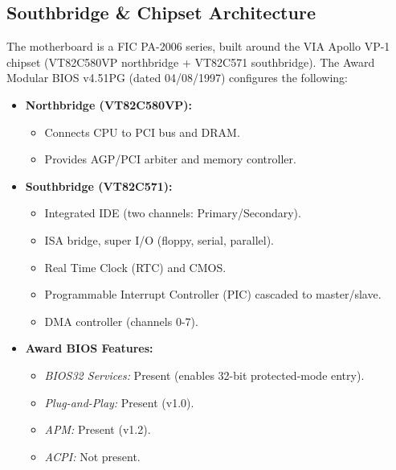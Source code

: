 \documentclass[12pt,a4paper]{report}
\begin{document}
	\subsection{Southbridge \& Chipset Architecture}
	\label{sec:southbridge}
	
	The motherboard is a FIC PA-2006 series, built around the VIA Apollo VP-1 chipset (VT82C580VP northbridge + VT82C571 southbridge). The Award Modular BIOS v4.51PG (dated 04/08/1997) configures the following:
	
	\begin{itemize}
		\item \textbf{Northbridge (VT82C580VP):}
		\begin{itemize}
			\item Connects CPU to PCI bus and DRAM.
			\item Provides AGP/PCI arbiter and memory controller.
		\end{itemize}
		\item \textbf{Southbridge (VT82C571):}
		\begin{itemize}
			\item Integrated IDE (two channels: Primary/Secondary).
			\item ISA bridge, super I/O (floppy, serial, parallel).
			\item Real Time Clock (RTC) and CMOS.
			\item Programmable Interrupt Controller (PIC) cascaded to master/slave.
			\item DMA controller (channels 0-7).
		\end{itemize}
		\item \textbf{Award BIOS Features:}
		\begin{itemize}
			\item \emph{BIOS32 Services:} Present (enables 32-bit protected-mode entry).
			\item \emph{Plug-and-Play:} Present (v1.0).
			\item \emph{APM:} Present (v1.2).
			\item \emph{ACPI:} Not present.
		\end{itemize}
	\end{itemize}
	
\end{document}
